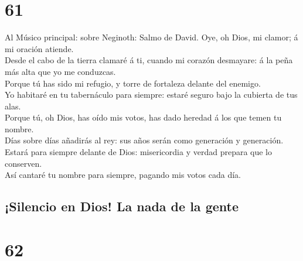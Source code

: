\hypertarget{section-60}{%
\section{61}\label{section-60}}

 Al Músico principal: sobre Neginoth: Salmo de David. Oye,
oh Dios, mi clamor; á mi oración atiende.\\
 Desde el cabo de la tierra clamaré á ti, cuando mi
corazón desmayare: á la peña más alta que yo me conduzcas.\\
 Porque tú has sido mi refugio, y torre de fortaleza
delante del enemigo.\\
 Yo habitaré en tu tabernáculo para siempre: estaré seguro
bajo la cubierta de tus alas.\\
 Porque tú, oh Dios, has oído mis votos, has dado heredad
á los que temen tu nombre.\\
 Días sobre días añadirás al rey: sus años serán como
generación y generación.\\
 Estará para siempre delante de Dios: misericordia y
verdad prepara que lo conserven.\\
 Así cantaré tu nombre para siempre, pagando mis votos
cada día.

\hypertarget{silencio-en-dios-la-nada-de-la-gente}{%
\subsection{¡Silencio en Dios! La nada de la
gente}\label{silencio-en-dios-la-nada-de-la-gente}}

\hypertarget{section-61}{%
\section{62}\label{section-61}}

